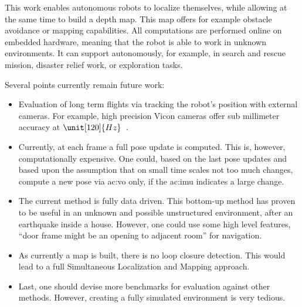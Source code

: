This work enables autonomous robots to localize themselves, while allowing at the same time to build a depth map.
This map offers for example obstacle avoidance or mapping capabilities.
All computations are performed online on embedded hardware, meaning that the robot is able to work in unknown environments.
It can support autonomously, for example, in search and rescue mission, disaster relief work, or exploration tasks.

Several points currently remain future work:

\begin{itemize}
  \item Evaluation of long term flights via tracking the robot's position with external cameras. For example, high precision Vicon cameras offer sub millimeter accuracy at $\unit[120]{Hz}$~\cite{windolf2008systematic}.
  \item Currently, at each frame a full pose update is computed. This is, however, computationally expensive. One could, based on the last pose updates and based upon the assumption that on small time scales not too much changes, compute a new pose via \gls{ac:vo} only, if the \gls{ac:imu} indicates a large change.
  \item The current method is fully data driven. This bottom-up method has proven to be useful in an unknown and possible unstructured environment, \eg after an earthquake inside a house. However, one could use some high level features, \eg ``door frame might be an opening to adjacent room'' for navigation.
  \item As currently a map is built, there is no loop closure detection. This would lead to a full Simultaneous Localization and Mapping approach.
  \item Last, one should devise more benchmarks for evaluation against other methods. However, creating a fully simulated environment is very tedious.
\end{itemize}
